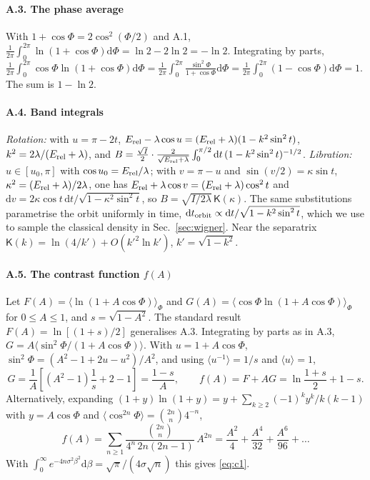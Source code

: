 \documentclass[preprint,12pt]{elsarticle}
\newcommand{\dd}{\mathrm{d}}
\newcommand{\Erel}{E_{\rm rel}}
\begin{document}
\paragraph{A.3. The phase average} With $1+\cos\Phi=2\cos^{2}(\Phi/2)$ and A.1,
$\frac{1}{2\pi}\int_{0}^{2\pi}\ln(1+\cos\Phi)\dd\Phi=\ln2-2\ln2=-\ln2$.
Integrating by parts,
$\frac{1}{2\pi}\int_{0}^{2\pi}\cos\Phi\ln(1+\cos\Phi)\dd\Phi
=\frac{1}{2\pi}\int_{0}^{2\pi}\frac{\sin^{2}\Phi}{1+\cos\Phi}\dd\Phi
=\frac{1}{2\pi}\int_{0}^{2\pi}(1-\cos\Phi)\dd\Phi=1$. The sum is $1-\ln2$.

\paragraph{A.4. Band integrals} \emph{Rotation:} with $u=\pi-2t$,
$\Erel-\lambda\cos u=(\Erel+\lambda)(1-k^{2}\sin^{2}t)$,
$k^{2}=2\lambda/(\Erel+\lambda)$, and $B=\tfrac{\sqrt I}{2}\cdot
\tfrac{2}{\sqrt{\Erel+\lambda}}\int_{0}^{\pi/2}\dd t\,(1-k^{2}\sin^{2}t)^{-1/2}$.
\emph{Libration:} $u\in[u_{0},\pi]$ with $\cos u_{0}=\Erel/\lambda$; with
$v=\pi-u$ and $\sin(v/2)=\kappa\sin t$, $\kappa^{2}=(\Erel+\lambda)/2\lambda$,
one has $\Erel+\lambda\cos v=(\Erel+\lambda)\cos^{2}t$ and
$\dd v=2\kappa\cos t\,\dd t/\sqrt{1-\kappa^{2}\sin^{2}t}$, so
$B=\sqrt{I/2\lambda}\,\mathsf{K}(\kappa)$. The same substitutions parametrise
the orbit uniformly in time, $\dd t_{\rm orbit}\propto\dd t/\sqrt{1-k^{2}\sin^{2}t}$,
which we use to sample the classical density in Sec.~\ref{sec:wigner}. Near the
separatrix $\mathsf{K}(k)=\ln(4/k')+O(k'^{2}\ln k')$, $k'=\sqrt{1-k^{2}}$.

\paragraph{A.5. The contrast function $f(A)$} Let
$F(A)=\langle\ln(1+A\cos\Phi)\rangle_{\Phi}$ and
$G(A)=\langle\cos\Phi\ln(1+A\cos\Phi)\rangle_{\Phi}$ for $0\le A\le1$, and
$s=\sqrt{1-A^{2}}$. The standard result~\cite{GR}
$F(A)=\ln[(1+s)/2]$ generalises A.3. Integrating by parts as in A.3,
$G=A\langle\sin^{2}\Phi/(1+A\cos\Phi)\rangle$. With $u=1+A\cos\Phi$,
$\sin^{2}\Phi=(A^{2}-1+2u-u^{2})/A^{2}$, and using $\langle u^{-1}\rangle=1/s$ and
$\langle u\rangle=1$,
\begin{equation}
G=\frac{1}{A}\left[(A^{2}-1)\frac{1}{s}+2-1\right]=\frac{1-s}{A},\qquad
f(A)=F+AG=\ln\frac{1+s}{2}+1-s .
\end{equation}
Alternatively, expanding $(1+y)\ln(1+y)=y+\sum_{k\ge2}(-1)^{k}y^{k}/k(k-1)$ with
$y=A\cos\Phi$ and $\langle\cos^{2n}\Phi\rangle=\binom{2n}{n}4^{-n}$,
\begin{equation}
f(A)=\sum_{n\ge1}\frac{\binom{2n}{n}}{4^{n}\,2n(2n-1)}\,A^{2n}
=\frac{A^{2}}{4}+\frac{A^{4}}{32}+\frac{A^{6}}{96}+\dots
\end{equation}
With $\int_{0}^{\infty}e^{-4n\sigma^{2}\beta^{2}}\dd\beta=\sqrt\pi/(4\sigma\sqrt n)$
this gives \eqref{eq:c1}.
\end{document}
